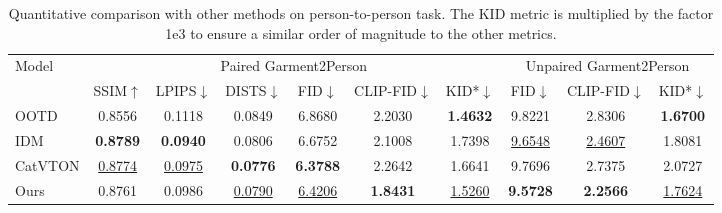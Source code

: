 \begin{table*}[htbp]
\centering
\begin{tabular}{l|cccccc|ccc}
\toprule
\multirow{2}{*}{Model} & \multicolumn{6}{c|}{Paired Garment2Person}            & \multicolumn{3}{c}{Unpaired Garment2Person} \\ \cmidrule(){2-10} 
                       & SSIM$\uparrow$    & LPIPS$\downarrow$  & DISTS$\downarrow$  & FID$\downarrow$     & CLIP-FID$\downarrow$ & KID*$\downarrow$    & FID$\downarrow$             & CLIP-FID$\downarrow$       & KID*$\downarrow$          \\ \midrule
OOTD             & 0.8556 & 0.1118 & 0.0849 & 6.8680  & 2.2030 & \textbf{1.4632}       & 9.8221 & 2.8306 & \textbf{1.6700}      \\
IDM              & \textbf{0.8789} & \textbf{0.0940} & 0.0806 & 6.6752  & 2.1008 & 1.7398   & \underline{9.6548} & \underline{2.4607} & 1.8081       \\
CatVTON     & \underline{0.8774} & \underline{0.0975} & \textbf{0.0776} & \textbf{6.3788}  & 2.2642 & 1.6641      & 9.7696 & 2.7375 & 2.0727      \\ 
Ours                 & 0.8761 & 0.0986 & \underline{0.0790} & \underline{6.4206} & \textbf{1.8431}   & \underline{1.5260}  & \textbf{9.5728} & \textbf{2.2566} & \underline{1.7624}      \\ \bottomrule
\end{tabular}
\caption{Quantitative comparison with other methods on person-to-person task. The KID metric is multiplied by the factor 1e3 to ensure a similar order of magnitude to the other metrics.}
\label{tab:quantitative_garment}
\end{table*}